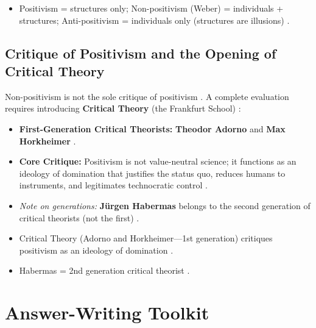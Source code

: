 \begin{QuickRevision}
\begin{itemize}
    \item Positivism = structures only; Non-positivism (Weber) = individuals + structures; Anti-positivism = individuals only (structures are illusions) .
\end{itemize}
\end{QuickRevision}

\subsection{Critique of Positivism and the Opening of Critical Theory}
Non-positivism is not the sole critique of positivism . A complete evaluation requires introducing \textbf{Critical Theory} (the Frankfurt School) :
\begin{itemize}
    \item \textbf{First-Generation Critical Theorists:} \textbf{Theodor Adorno} and \textbf{Max Horkheimer} .
    \item \textbf{Core Critique:} Positivism is not value-neutral science; it functions as an ideology of domination that justifies the status quo, reduces humans to instruments, and legitimates technocratic control .
    \item \textit{Note on generations:} \textbf{Jürgen Habermas} belongs to the second generation of critical theorists (not the first) .
\end{itemize}

\begin{QuickRevision}
\begin{itemize}
    \item Critical Theory (Adorno and Horkheimer---1st generation) critiques positivism as an ideology of domination .
    \item Habermas = 2nd generation critical theorist .
\end{itemize}
\end{QuickRevision}

\sectiondivider

\section{Answer-Writing Toolkit}

